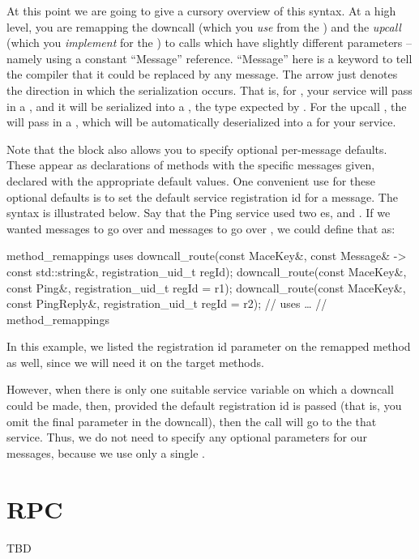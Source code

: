 At this point we are going to give a cursory overview of this syntax.
At a high level, you are remapping the  downcall
(which you \emph{use} from the ) and the
 \emph{upcall} (which you \emph{implement} for the
) to calls which have slightly different
parameters -- namely using a constant ``Message'' reference.
``Message'' here is a keyword to tell the compiler that it could be
replaced by any message.  The arrow just denotes the direction in
which the serialization occurs.  That is, for
, your service will pass in a
, and it will be serialized into a
, the type expected by .
For the upcall , the 
will pass in a , which will be automatically
deserialized into a  for your service.

Note that the  block also allows you to specify optional
per-message defaults.  These appear as declarations of methods with the 
specific messages given, declared with the appropriate default values.
One convenient use for these optional defaults
is to set the default service registration id for a message.  The
syntax is illustrated below.  Say that the Ping service used two
es,  and
.  If we wanted  messages to go over
 and  messages to go over
, we could define that as:

\begin{programlisting}
method_remappings {
  uses {
    downcall_route(const MaceKey&, const Message& -> const std::string&, registration_uid_t regId);
    downcall_route(const MaceKey&, const Ping&, registration_uid_t regId = r1);
    downcall_route(const MaceKey&, const PingReply&, registration_uid_t regId = r2);
  } // uses
  \ldots
} // method_remappings
\end{programlisting}

In this example, we listed the registration id parameter on the remapped
method as well, since we will need it on the target methods.

However, when there is only one suitable service variable on which a
downcall could be made, then, provided the default registration id is
passed (that is, you omit the final parameter in the downcall), then
the call will go to the that service.  Thus, we do not need to specify
any optional parameters for our messages, because we use only a single
.


\section{RPC}
\label{sec:RPC}
TBD %
